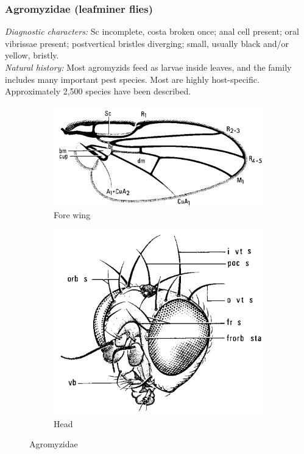 \documentclass[letterpaper, 11pt]{article}
\begin{document}
\subsubsection{Agromyzidae (leafminer flies)}
\noindent{}\textit{Diagnostic characters:} Sc incomplete, costa broken once; anal cell present; oral vibrissae present; postvertical bristles diverging; small, usually black and/or yellow, bristly.\\

\noindent{}\textit{Natural history:} Most agromyzids feed as larvae inside leaves, and the family includes many important pest species. Most are highly host-specific. Approximately 2,500 species have been described.

\begin{figure}[ht!]
    \centering
    \begin{subfigure}[ht!]{0.45\textwidth}
        \includegraphics[width=\textwidth]{AgromyzidWing}
        \caption{Fore wing \citep[][Fig. 73.9]{mcalpine1981manualv2}}
        \label{fig:agromyzid1}
    \end{subfigure}
    \qquad
    \begin{subfigure}[ht!]{0.3\textwidth}
        \includegraphics[width=\textwidth]{AgromyzidHead}
        \caption{Head \citep[][Fig. 73.2]{mcalpine1981manualv2}}
        \label{fig:agromyzid2}
    \end{subfigure}
    \caption{Agromyzidae}\label{fig:agromyzids}
\end{figure}
\end{document}

